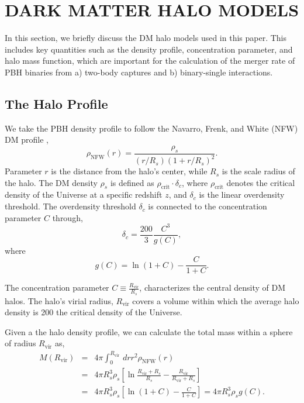 \documentclass[aps, prd, reprint, nofootinbib]{revtex4-2}
\begin{document}
\section {DARK MATTER HALO MODELS}
\label{sec:DM_haio_models}

In this section, we briefly discuss the DM halo models used in this paper. This includes key quantities such as the density profile, concentration parameter, and halo mass function, which are important for the calculation of the merger rate of PBH binaries from a) two-body captures and b) binary-single interactions.


\subsection{The Halo Profile}
We take the PBH density profile to follow the  Navarro, Frenk, and White (NFW) DM profile \cite{Navarro:1995iw}, 
\begin{equation}   
\rho_{\textrm{NFW}}(r)=\frac{\rho_s}{\left(r / R_{s}\right)\left(1+r / R_{s}\right)^2}.
\end{equation}
Parameter $r$ is the distance from the halo's center, while $R_{s}$ is the scale radius of the halo. The DM density $\rho_{s}$ is defined as $\rho_{\textrm{crit}} \cdot \delta_{c}$, where $\rho_{\textrm{crit}}$ denotes the critical density of the Universe at a specific redshift $z$, and $\delta_{c}$ is the linear overdensity threshold. The overdensity threshold $\delta_{c}$ is connected to the concentration parameter $C$ through,
\begin{equation}   
\delta_{c}=\frac{200}{3} \frac{C^3}{g(C)},
\end{equation}
where 
\begin{equation}
g(C)=\ln (1+C)-\frac{C}{1+C}.
\end{equation}

The concentration parameter $C\equiv \frac{R_{\textrm{vir}}}{R_s}$, characterizes the
central density of DM halos. The halo's virial radius, $R_{\textrm{vir}}$ covers a volume
within which the average halo density is 200 the critical density of the Universe.

Given a the halo density profile, we can calculate the total mass within a sphere of radius $R_{\textrm{vir}}$ as,
\begin{eqnarray}
M\left(R_{\textrm{vir}}\right)&=&4 \pi \int_0^{R_{\textrm {vir }}}d r r^2 \rho_{\textrm{NFW}}(r)
\nonumber \\
&=&4 \pi R_s^3 \rho_s\left[\ln \frac{R_{\textrm{vir}}+R_s}{R_s}-\frac{R_{\textrm{vir}}}{R_{\textrm{vir}}+R_s}\right]
\\
&=&4 \pi R_s^3 \rho_s\left[\ln (1+C)-\frac{C}{1+C}\right]=4 \pi R_s^3 \rho_s g(C). \nonumber
\label{rh0_s} 
\end{eqnarray}
\end{document}
